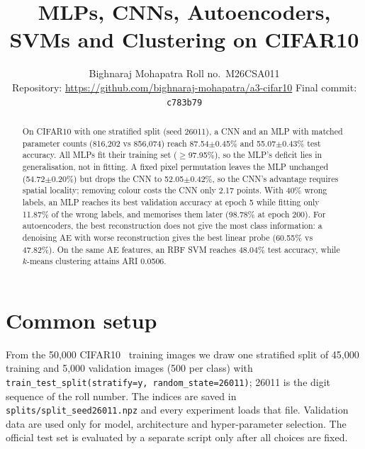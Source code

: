 \documentclass[10pt,twocolumn,letterpaper]{article}
\title{MLPs, CNNs, Autoencoders, SVMs and Clustering on CIFAR10}
\author{Bighnaraj Mohapatra \quad Roll no.\ M26CSA011\\
Repository: \url{https://github.com/bighnaraj-mohapatra/a3-cifar10} \quad Final commit: \texttt{c783b79}}
\begin{document}
\maketitle

\begin{abstract}
On CIFAR10 with one stratified split (seed 26011), a CNN and an MLP with matched parameter counts (816,202 vs 856,074) reach 87.54$\pm$0.45\% and 55.07$\pm$0.43\% test accuracy. All MLPs fit their training set ($\geq$97.95\%), so the MLP's deficit lies in generalisation, not in fitting. A fixed pixel permutation leaves the MLP unchanged (54.72$\pm$0.20\%) but drops the CNN to 52.05$\pm$0.42\%, so the CNN's advantage requires spatial locality; removing colour costs the CNN only 2.17 points. With 40\% wrong labels, an MLP reaches its best validation accuracy at epoch 5 while fitting only 11.87\% of the wrong labels, and memorises them later (98.78\% at epoch 200). For autoencoders, the best reconstruction does not give the most class information: a denoising AE with worse reconstruction gives the best linear probe (60.55\% vs 47.82\%). On the same AE features, an RBF SVM reaches 48.04\% test accuracy, while $k$-means clustering attains ARI 0.0506.
\end{abstract}

\section{Common setup}
\label{sec:setup}
From the 50,000 CIFAR10~\cite{krizhevsky2009cifar} training images we draw one stratified split of 45,000 training and 5,000
validation images (500 per class) with \texttt{train\_test\_split(stratify=y, random\_state=26011)};
26011 is the digit sequence of the roll number. The indices are saved in
\texttt{splits/split\_seed26011.npz} and every experiment loads that file. Validation data are used only
for model, architecture and hyper-parameter selection. The official test set is evaluated by a separate
script only after all choices are fixed.
\end{document}
